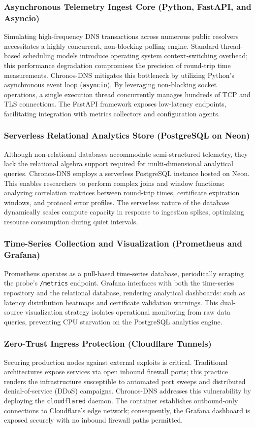 \documentclass[10pt,journal,compsoc]{IEEEtran}
\begin{document}
\subsubsection{Asynchronous Telemetry Ingest Core (Python, FastAPI, and Asyncio)}
Simulating high-frequency DNS transactions across numerous public resolvers necessitates a highly concurrent, non-blocking polling engine. Standard thread-based scheduling models introduce operating system context-switching overhead; this performance degradation compromises the precision of round-trip time measurements. Chronos-DNS mitigates this bottleneck by utilizing Python's asynchronous event loop (\texttt{asyncio}). By leveraging non-blocking socket operations, a single execution thread concurrently manages hundreds of TCP and TLS connections. The FastAPI framework exposes low-latency endpoints, facilitating integration with metrics collectors and configuration agents.

\subsubsection{Serverless Relational Analytics Store (PostgreSQL on Neon)}
Although non-relational databases accommodate semi-structured telemetry, they lack the relational algebra support required for multi-dimensional analytical queries. Chronos-DNS employs a serverless PostgreSQL instance hosted on Neon. This enables researchers to perform complex joins and window functions: analyzing correlation matrices between round-trip times, certificate expiration windows, and protocol error profiles. The serverless nature of the database dynamically scales compute capacity in response to ingestion spikes, optimizing resource consumption during quiet intervals.

\subsubsection{Time-Series Collection and Visualization (Prometheus and Grafana)}
Prometheus operates as a pull-based time-series database, periodically scraping the probe's \texttt{/metrics} endpoint. Grafana interfaces with both the time-series repository and the relational database, rendering analytical dashboards: such as latency distribution heatmaps and certificate validation warnings. This dual-source visualization strategy isolates operational monitoring from raw data queries, preventing CPU starvation on the PostgreSQL analytics engine.

\subsubsection{Zero-Trust Ingress Protection (Cloudflare Tunnels)}
Securing production nodes against external exploits is critical. Traditional architectures expose services via open inbound firewall ports; this practice renders the infrastructure susceptible to automated port sweeps and distributed denial-of-service (DDoS) campaigns. Chronos-DNS addresses this vulnerability by deploying the \texttt{cloudflared} daemon. The container establishes outbound-only connections to Cloudflare's edge network; consequently, the Grafana dashboard is exposed securely with no inbound firewall paths permitted.
\end{document}

